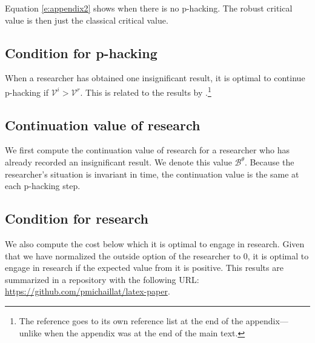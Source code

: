 \documentclass[letterpaper,12pt,leqno]{article}
\newcommand{\bib}{bibliography.bib}
\begin{document}
Equation \eqref{e:appendix2} shows when there is no p-hacking. The robust critical value is then just the classical critical value. 

\subsection{Condition for p-hacking}\label{a:subappendix}

When a researcher has obtained one insignificant result, it is optimal to continue p-hacking if $\mathcal{V}^i > \mathcal{V}^r$. This is related to the results by \citet{MS21b}.\footnote{The reference goes to its own reference list at the end of the appendix---unlike when the appendix was at the end of the main text.}

\subsection{Continuation value of research} 

We first compute the continuation value of research for a researcher who has already recorded an insignificant result. We denote this value $\mathcal{B}^\theta$. Because the researcher's situation is invariant in time, the continuation value is the same at each p-hacking step. 

\subsection{Condition for research} 

We also compute the cost below which it is optimal to engage in research. Given that we have normalized the outside option of the researcher to $0$, it is optimal to engage in research if the expected value from it is positive. This results are summarized in a repository with the following URL: \url{https://github.com/pmichaillat/latex-paper}.


\end{document}
